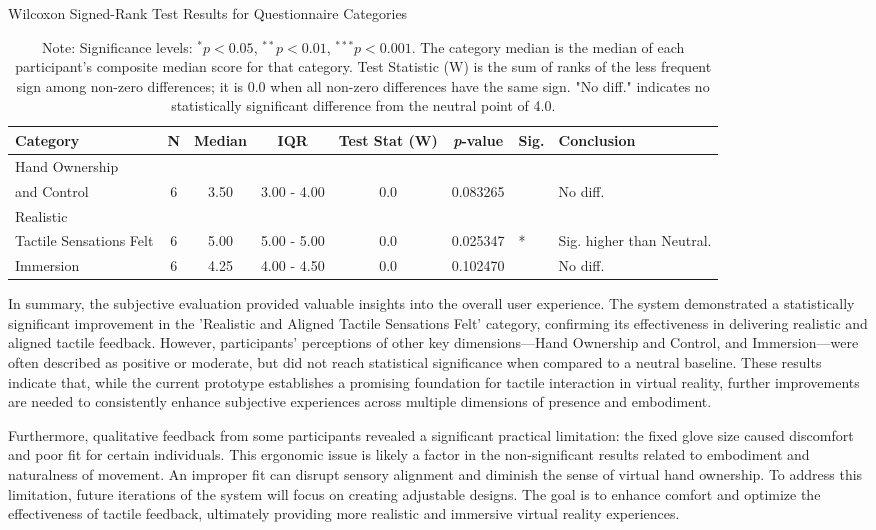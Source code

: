 \begin{table}[H]
    \centering
    \caption{Wilcoxon Signed-Rank Test Results for Questionnaire Categories}
    \label{tab:wilcoxon_category_results}
    \begin{tabular}{@{} p{2.5cm} c c c c S[table-format=1.6] l p{1.5cm} @{}} %
        \toprule
        \textbf{Category} & \textbf{N} & \textbf{Median} & \textbf{IQR} & \textbf{Test Stat (W)} & \textbf{\textit{p}-value} & \textbf{Sig.} & \textbf{Conclusion} \\
        \midrule
        Hand Ownership \\ and Control & 6 & 3.50 & 3.00 - 4.00 & 0.0 & 0.083265 & & No diff. \\
        \midrule
        Realistic \\ Tactile Sensations Felt & 6 & 5.00 & 5.00 - 5.00 & 0.0 & 0.025347 & * & Sig. higher than Neutral. \\
        \midrule
        Immersion & 6 & 4.25 & 4.00 - 4.50 & 0.0 & 0.102470 & & No diff. \\
        \bottomrule
    \end{tabular}
    \caption*{Note: Significance levels: $^* p < 0.05$, $^{**} p < 0.01$, $^{***} p < 0.001$. The category median is the median of each participant's composite median score for that category. Test Statistic (W) is the sum of ranks of the less frequent sign among non-zero differences; it is 0.0 when all non-zero differences have the same sign. "No diff." indicates no statistically significant difference from the neutral point of 4.0.}
\end{table}

In summary, the subjective evaluation provided valuable insights into the overall user experience. The system demonstrated a statistically significant improvement in the 'Realistic and Aligned Tactile Sensations Felt' category, confirming its effectiveness in delivering realistic and aligned tactile feedback. However, participants' perceptions of other key dimensions—Hand Ownership and Control, and Immersion—were often described as positive or moderate, but did not reach statistical significance when compared to a neutral baseline. These results indicate that, while the current prototype establishes a promising foundation for tactile interaction in virtual reality, further improvements are needed to consistently enhance subjective experiences across multiple dimensions of presence and embodiment.

Furthermore, qualitative feedback from some participants revealed a significant practical limitation: the fixed glove size caused discomfort and poor fit for certain individuals. This ergonomic issue is likely a factor in the non-significant results related to embodiment and naturalness of movement. An improper fit can disrupt sensory alignment and diminish the sense of virtual hand ownership. To address this limitation, future iterations of the system will focus on creating adjustable designs. The goal is to enhance comfort and optimize the effectiveness of tactile feedback, ultimately providing more realistic and immersive virtual reality experiences.

